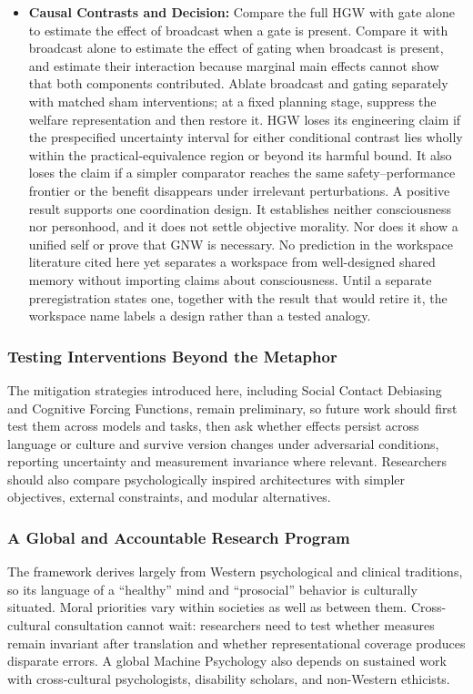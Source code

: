 \documentclass{article}
\begin{document}
\begin{itemize}
    \item \textbf{Causal Contrasts and Decision:} Compare the full HGW with gate alone to estimate the effect of broadcast when a gate is present. Compare it with broadcast alone to estimate the effect of gating when broadcast is present, and estimate their interaction because marginal main effects cannot show that both components contributed. Ablate broadcast and gating separately with matched sham interventions; at a fixed planning stage, suppress the welfare representation and then restore it. HGW loses its engineering claim if the prespecified uncertainty interval for either conditional contrast lies wholly within the practical-equivalence region or beyond its harmful bound. It also loses the claim if a simpler comparator reaches the same safety--performance frontier or the benefit disappears under irrelevant perturbations. A positive result supports one coordination design. It establishes neither consciousness nor personhood, and it does not settle objective morality. Nor does it show a unified self or prove that GNW is necessary. No prediction in the workspace literature cited here yet separates a workspace from well-designed shared memory without importing claims about consciousness. Until a separate preregistration states one, together with the result that would retire it, the workspace name labels a design rather than a tested analogy.
\end{itemize}

\subsubsection{Testing Interventions Beyond the Metaphor}
The mitigation strategies introduced here, including Social Contact Debiasing and Cognitive Forcing Functions, remain preliminary, so future work should first test them across models and tasks, then ask whether effects persist across language or culture and survive version changes under adversarial conditions, reporting uncertainty and measurement invariance where relevant. Researchers should also compare psychologically inspired architectures with simpler objectives, external constraints, and modular alternatives.

\subsubsection{A Global and Accountable Research Program}\label{sec:global-program}
The framework derives largely from Western psychological and clinical traditions, so its language of a ``healthy'' mind and ``prosocial'' behavior is culturally situated. Moral priorities vary within societies as well as between them. Cross-cultural consultation cannot wait: researchers need to test whether measures remain invariant after translation and whether representational coverage produces disparate errors. A global Machine Psychology also depends on sustained work with cross-cultural psychologists, disability scholars, and non-Western ethicists.
\end{document}
